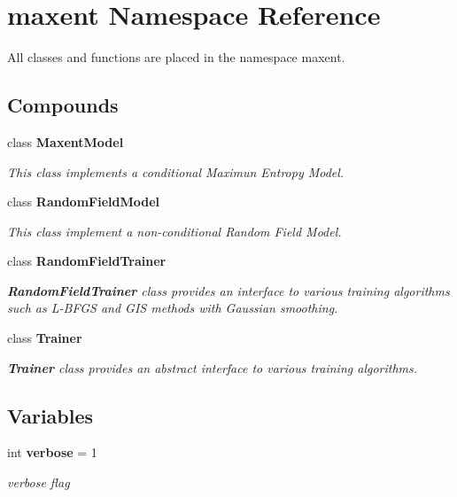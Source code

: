 \section{maxent Namespace Reference}
\label{namespacemaxent}
All classes and functions are placed in the namespace maxent.  


\subsection*{Compounds}
\begin{CompactItemize}
\item 
class {\bf Maxent\-Model}
\begin{CompactList}\small\item\em This class implements a conditional Maximun Entropy Model. \item\end{CompactList}\item 
class {\bf Random\-Field\-Model}
\begin{CompactList}\small\item\em This class implement a non-conditional Random Field Model. \item\end{CompactList}\item 
class {\bf Random\-Field\-Trainer}
\begin{CompactList}\small\item\em {\bf Random\-Field\-Trainer} class provides an interface to various training algorithms such as L-BFGS and GIS methods with Gaussian smoothing. \item\end{CompactList}\item 
class {\bf Trainer}
\begin{CompactList}\small\item\em {\bf Trainer} class provides an abstract interface to various training algorithms. \item\end{CompactList}\end{CompactItemize}
\subsection*{Variables}
\begin{CompactItemize}
\item 
int {\bf verbose} = 1
\begin{CompactList}\small\item\em verbose flag \item\end{CompactList}\end{CompactItemize}


